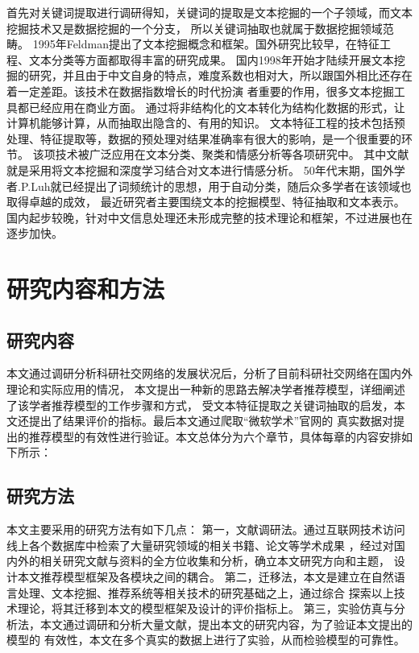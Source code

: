 首先对关键词提取进行调研得知，关键词的提取是文本挖掘的一个子领域，而文本挖掘技术又是数据挖掘的一个分支，%
所以关键词抽取也就属于数据挖掘领域范畴。
1995年Feldman提出了文本挖掘概念和框架。国外研究比较早，在特征工程、文本分类等方面都取得丰富的研究成果。%
国内1998年开始才陆续开展文本挖掘的研究，并且由于中文自身的特点，难度系数也相对大，所以跟国外相比还存在%
着一定差距。该技术在数据指数增长的时代扮演%
者重要的作用，很多文本挖掘工具都已经应用在商业方面。%
通过将非结构化的文本转化为结构化数据的形式，让计算机能够计算，从而抽取出隐含的、有用的知识。%
文本特征工程的技术包括预处理、特征提取等，数据的预处理对结果准确率有很大的影响，是一个很重要的环节。%
该项技术被广泛应用在文本分类、聚类和情感分析等各项研究中。%
其中文献就是采用将文本挖掘和深度学习结合对文本进行情感分析。%
50年代末期，国外学者.P.Luh就已经提出了词频统计的思想，用于自动分类，随后众多学者在该领域也取得卓越的成效，%
最近研究者主要围绕文本的挖掘模型、特征抽取和文本表示。%
国内起步较晚，针对中文信息处理还未形成完整的技术理论和框架，不过进展也在逐步加快。



\section{研究内容和方法}
\subsection{研究内容}
本文通过调研分析科研社交网络的发展状况后，分析了目前科研社交网络在国内外理论和实际应用的情况，%
本文提出一种新的思路去解决学者推荐模型，详细阐述了该学者推荐模型的工作步骤和方式，%
受文本特征提取之关键词抽取的启发，本文还提出了结果评价的指标。最后本文通过爬取“微软学术”官网的%
真实数据对提出的推荐模型的有效性进行验证。本文总体分为六个章节，具体每章的内容安排如下所示：

\subsection{研究方法}
本文主要采用的研究方法有如下几点：
第一，文献调研法。通过互联网技术访问线上各个数据库中检索了大量研究领域的相关书籍、论文等学术成果%
，经过对国内外的相关研究文献与资料的全方位收集和分析，确立本文研究方向和主题，%
设计本文推荐模型框架及各模块之间的耦合。
第二，迁移法，本文是建立在自然语言处理、文本挖掘、推荐系统等相关技术的研究基础之上，通过综合%
探索以上技术理论，将其迁移到本文的模型框架及设计的评价指标上。
第三，实验仿真与分析法，本文通过调研和分析大量文献，提出本文的研究内容，为了验证本文提出的模型的%
有效性，本文在多个真实的数据上进行了实验，从而检验模型的可靠性。
